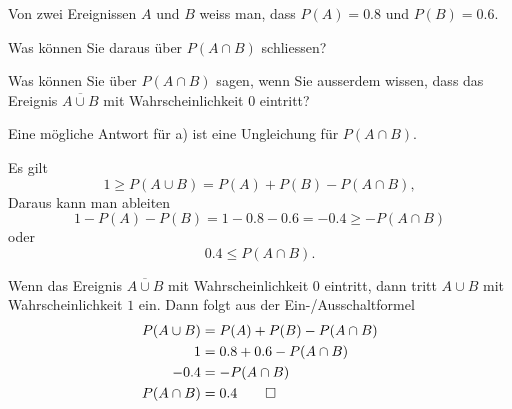 Von zwei Ereignissen $A$ und $B$ weiss man, dass $P(A)=0.8$ und $P(B)=0.6$.
\begin{teilaufgaben}
\item
Was können Sie daraus über $P(A\cap B)$ schliessen?
\item
Was können Sie über $P(A\cap B)$ sagen, wenn Sie ausserdem wissen, dass 
das Ereignis $\overline{A\cup B}$ mit Wahrscheinlichkeit $0$ eintritt?
\end{teilaufgaben}


\begin{hinweis}
Eine mögliche Antwort für a) ist eine Ungleichung für $P(A\cap B)$.
\end{hinweis}

\begin{loesung}
\begin{teilaufgaben}
\item 
Es gilt
\[
1\ge P(A\cup B)=P(A)+P(B)-P(A\cap B),
\]
Daraus kann man ableiten
\[
1-P(A)-P(B)=1-0.8-0.6=-0.4 \ge -P(A\cap B)
\]
oder
\[
0.4\le P(A\cap B).
\]
\item 
Wenn das Ereignis $\overline{A\cup B}$ mit Wahrscheinlichkeit $0$ eintritt,
dann tritt $A\cup B$ mit Wahrscheinlichkeit $1$ ein.
Dann folgt aus der Ein-/Ausschaltformel
\begin{align*}
P(A\cup B)&=P(A)+P(B)-P(A\cap B)\\
1&=0.8+0.6-P(A\cap B)\\
-0.4&=-P(A\cap B)\\
P(A\cap B)&=0.4
\qedhere
\end{align*}
\end{teilaufgaben}
\end{loesung}

